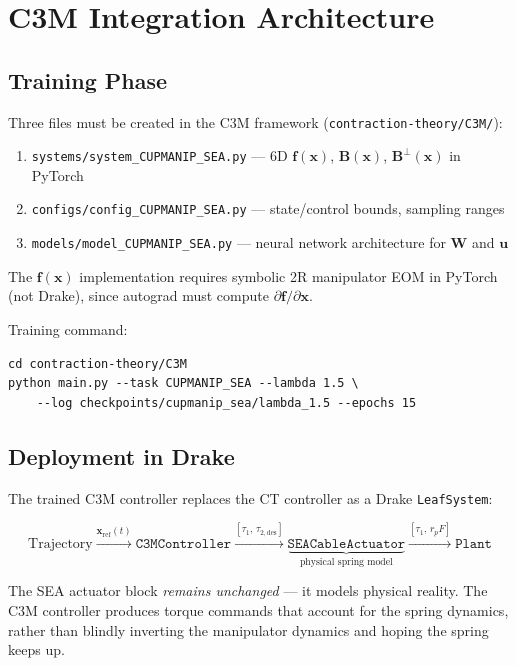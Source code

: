 \documentclass[11pt, a4paper]{article}
\newcommand{\bu}{\bm{u}}
\newcommand{\bx}{\bm{x}}
\newcommand{\bB}{\bm{B}}
\newcommand{\bW}{\bm{W}}
\begin{document}
\section{C3M Integration Architecture}
\label{sec:integration}

\subsection{Training Phase}

Three files must be created in the C3M framework
(\texttt{contraction-theory/C3M/}):

\begin{enumerate}
\item \texttt{systems/system\_CUPMANIP\_SEA.py} --- 6D $\bm{f}(\bx)$,
      $\bB(\bx)$, $\bB^\perp(\bx)$ in PyTorch
\item \texttt{configs/config\_CUPMANIP\_SEA.py} --- state/control bounds,
      sampling ranges
\item \texttt{models/model\_CUPMANIP\_SEA.py} --- neural network
      architecture for $\bW$ and $\bu$
\end{enumerate}

The $\bm{f}(\bx)$ implementation requires symbolic 2R manipulator EOM
in PyTorch (not Drake), since autograd must compute $\partial\bm{f}/\partial\bx$.

Training command:
\begin{verbatim}
cd contraction-theory/C3M
python main.py --task CUPMANIP_SEA --lambda 1.5 \
    --log checkpoints/cupmanip_sea/lambda_1.5 --epochs 15
\end{verbatim}

\subsection{Deployment in Drake}

The trained C3M controller replaces the CT controller as a Drake
\texttt{LeafSystem}:

\[
\text{Trajectory}
\xrightarrow{\bx_\text{ref}(t)}
\texttt{C3MController}
\xrightarrow{[\tau_1,\,\tau_{2,\text{des}}]}
\underbrace{\texttt{SEACableActuator}}_{\text{physical spring model}}
\xrightarrow{[\tau_1,\,r_p F]}
\texttt{Plant}
\]

The SEA actuator block \emph{remains unchanged} --- it models physical reality.
The C3M controller produces torque commands that account for the spring dynamics,
rather than blindly inverting the manipulator dynamics and hoping the spring
keeps up.
\end{document}
